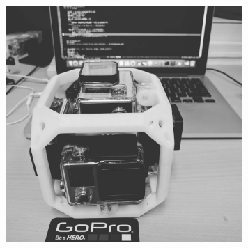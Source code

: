 \begin{frame}
{\begin{figure}[!ht]
      \includegraphics[width=9cm]{gopro.jpeg}
    \end{figure}
  }
  

\end{frame}
